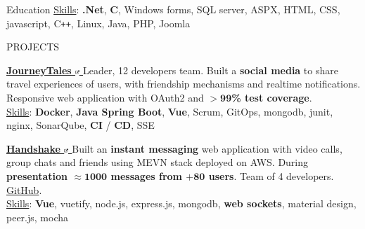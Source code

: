 \documentclass{resume} %
\def\intraexpvspace{0.15cm}
\begin{document}
\begin{rSection}{Education}
    \vspace*{-0.1cm}\hspace*{0.5cm}\underline{Skills}:
    \textbf{.Net},
    \textbf{C\text{\#}},
    Windows forms,
    SQL server,
    ASPX,
    HTML, CSS, javascript,
    C\texttt{++},
    Linux,
    Java,
    PHP,
    Joomla
\end{rSection}


\begin{rSection}{PROJECTS}
    \vspace{-1.25em}
    \item \textbf{\href{https://gitlab.com/usi-si-teaching/bachelor-inf/2023/software-atelier-4/team-4-pufferfish/backend}
        {
            JourneyTales
            \includegraphics[width=0.15cm, trim={10cm -10cm 0cm 0cm}]{ext-link-icon.png}
        }}
    {Leader, 12 developers team.
        Built a \textbf{social media} to share travel experiences of users,
        with friendship mechanisms and realtime notifications.
        Responsive web application with OAuth2 and $\boldsymbol{> 99}$\textbf{\% test coverage}.
    }\\[0.1cm]
    \hspace*{0.5cm}\underline{Skills}:
    \textbf{Docker},
    \textbf{Java Spring Boot},
    \textbf{Vue},
    Scrum,
    GitOps,
    mongodb,
    junit,
    nginx,
    SonarQube,
    \textbf{CI} / \textbf{CD},
    SSE

    \vspace{\intraexpvspace}
    \item \textbf{\href{https://handshakeapp.ch}{
            Handshake
            \includegraphics[width=0.15cm, trim={10cm -10cm 0cm 0cm}]{ext-link-icon.png}
        }}
    {Built an \textbf{instant messaging} web application with video calls, group chats and friends
        using MEVN stack deployed on AWS.
        During \textbf{presentation $\boldsymbol{\approx1000}$ messages from $\boldsymbol{+80}$ users}.
        Team of 4 developers.
        \href{https://github.com/ogs-at-usi/handshake}{GitHub}.
    }\\[0.1cm]
    \hspace*{0.5cm}\underline{Skills}:
    \textbf{Vue},
    vuetify,
    node.js,
    express.js,
    mongodb,
    \textbf{web sockets},
    material design,
    peer.js,
    mocha
\end{rSection}
\end{document}
